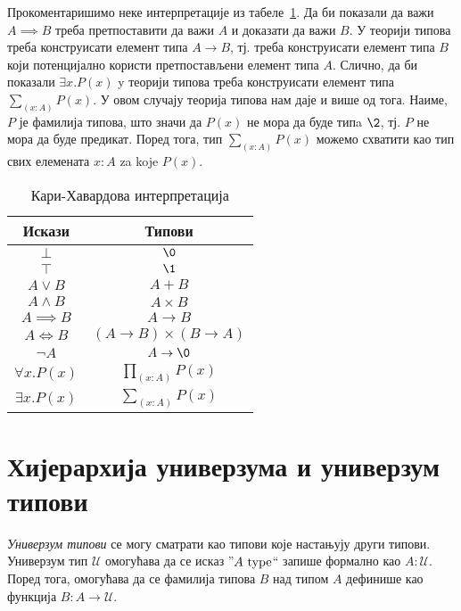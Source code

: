 \documentclass[12pt,oneside]{memoir}
\begin{document}
Прокоментаришимо неке интерпретације из табеле~\ref{table:curry_howard}. Да би показали да важи $A \implies B$ треба претпоставити да важи $A$ и доказати да важи $B$. У теорији типова треба конструисати елемент типа $A \to B$, тј. треба конструисати елемент типа $B$ који потенцијално користи претпостављени елемент типа $A$. Слично, да би показали $\exists x. P(x)$ y теорији типова треба конструисати елемент типа $\sum_{(x : A)} P(x)$. У овом случају теорија типова нам даје и више од тога. Наиме, $P$ је фамилија типова, што значи да $P(x)$ не мора да буде типa $\2$, тј. $P$ не мора да буде предикат. Поред тога, тип $\sum_{(x : A)} P(x)$ можемо схватити као тип свих елемената $x : A$ za koje $P (x)$. 

\begin{table}
    \begin{center}
        \begin{tabular}[c]{c c}
            Искази & Типови \\
            \hline%
            $\bot$ & $\0$ \\
            $\top$ & $\1$ \\
            $A \lor B$ & $A + B$ \\
            $A \land B$ & $A \times B$ \\
            $A \implies B$ & $A \to B$ \\
            $A \iff B$ & $(A \to B) \times (B \to A)$ \\
            $\neg A$ & $A \to \0$ \\
            $\forall x. P(x)$ & $\prod_{(x : A)} P(x)$ \\
            $\exists x. P(x)$ & $\sum_{(x : A)} P(x)$
        \end{tabular}
    \end{center}
    \caption{Кари\--Хавардова интерпретација}
    \label{table:curry_howard}
\end{table}

\section{Хијерархија универзума и универзум типови}

\emph{Универзум типови} се могу сматрати као типови које настањују други типови. Универзум тип $\mathcal{U}$ омогућава да се исказ ''$A~{\mathrm{type}}$`` запише формално као $A : \mathcal{U}$. Поред тога, омогућава да се фамилија типова $B$ над типом $A$ дефинише као функција $B : A \to \mathcal{U}$. 
\end{document}
